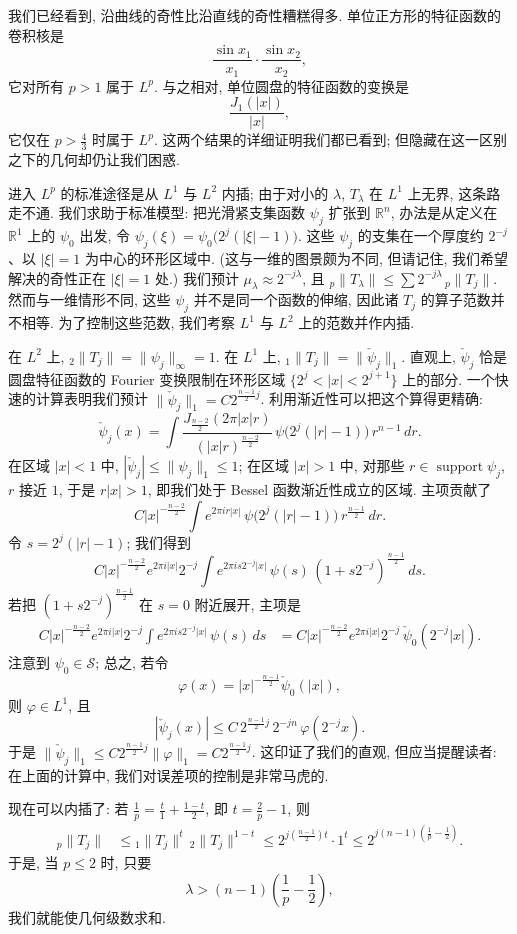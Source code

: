 \begin{remark}\label{rem:5.5}
我们已经看到, 沿曲线的奇性比沿直线的奇性糟糕得多. 单位正方形的特征函数的卷积核是
\[
\frac{\sin x_{1}}{x_{1}}\cdot\frac{\sin x_{2}}{x_{2}},
\]
它对所有 $p>1$ 属于 $L^{p}$. 与之相对, 单位圆盘的特征函数的变换是
\[
\frac{J_{1}(|x|)}{|x|},
\]
它仅在 $p>\frac{4}{3}$ 时属于 $L^p$. 这两个结果的详细证明我们都已看到; 但隐藏在这一区别之下的几何却仍让我们困惑.

进入 $L^p$ 的标准途径是从 $L^1$ 与 $L^2$ 内插; 由于对小的 $\lambda$, $T_\lambda$ 在 $L^1$ 上无界, 这条路走不通. 我们求助于标准模型: 把光滑紧支集函数 $\psi_j$ 扩张到 $\mathbb{R}^n$, 办法是从定义在 $\mathbb{R}^1$ 上的 $\psi_0$ 出发, 令 $\psi_j(\xi)=\psi_0\bigl(2^j(|\xi|-1)\bigr)$. 这些 $\psi_j$ 的支集在一个厚度约 $2^{-j}$、以 $|\xi|=1$ 为中心的环形区域中. (这与一维的图景颇为不同, 但请记住, 我们希望解决的奇性正在 $|\xi|=1$ 处.) 我们预计 $\mu_\lambda\approx 2^{-j\lambda}$, 且 ${}_p\|T_\lambda\|\leq\sum 2^{-j\lambda}\,{}_p\|T_j\|$. 然而与一维情形不同, 这些 $\psi_j$ 并不是同一个函数的伸缩, 因此诸 $T_j$ 的算子范数并不相等. 为了控制这些范数, 我们考察 $L^1$ 与 $L^2$ 上的范数并作内插.

在 $L^2$ 上, ${}_2\|T_j\|=\|\psi_j\|_\infty=1$. 在 $L^1$ 上, ${}_1\|T_j\|=\|\check{\psi}_j\|_1$. 直观上, $\check{\psi}_j$ 恰是圆盘特征函数的 Fourier 变换限制在环形区域 $\{2^j<|x|<2^{j+1}\}$ 上的部分. 一个快速的计算表明我们预计 $\|\check{\psi}_j\|_1=C2^{\frac{n-1}{2}j}$. 利用渐近性可以把这个算得更精确:
\[
\check{\psi}_{j}(x)=\int\frac{J_{\frac{n-2}{2}}(2\pi|x|r)}{(|x|r)^{\frac{n-2}{2}}}\,\psi\bigl(2^{j}(|r|-1)\bigr)\,r^{n-1}\,dr.
\]
在区域 $|x|<1$ 中, $|\check{\psi}_j|\leq\|\psi_j\|_1\leq 1$; 在区域 $|x|>1$ 中, 对那些 $r\in\operatorname{support}\psi_j$, $r$ 接近 $1$, 于是 $r|x|>1$, 即我们处于 Bessel 函数渐近性成立的区域. 主项贡献了
\[
C|x|^{-\frac{n-2}{2}}\int e^{2\pi ir|x|}\,\psi\bigl(2^{j}(|r|-1)\bigr)\,r^{\frac{n-1}{2}}\,dr.
\]
令 $s=2^{j}(|r|-1)$; 我们得到
\[
C|x|^{-\frac{n-2}{2}}e^{2\pi i|x|}2^{-j}\int e^{2\pi is2^{-j}|x|}\,\psi(s)\,(1+s2^{-j})^{\frac{n-1}{2}}\,ds.
\]
若把 $(1+s2^{-j})^{\frac{n-1}{2}}$ 在 $s=0$ 附近展开, 主项是
\begin{align*}
C|x|^{-\frac{n-2}{2}}e^{2\pi i|x|}2^{-j}\int e^{2\pi is2^{-j}|x|}\,\psi(s)\,ds
&=C|x|^{-\frac{n-2}{2}}e^{2\pi i|x|}2^{-j}\,\check{\psi}_{0}(2^{-j}|x|).
\end{align*}
注意到 $\psi_0\in\mathcal{S}$; 总之, 若令
\[
\varphi(x)=|x|^{-\frac{n-1}{2}}\check{\psi}_{0}(|x|),
\]
则 $\varphi\in L^1$, 且
\[
|\check{\psi}_{j}(x)|\leq C\,2^{\frac{n-1}{2}j}\,2^{-jn}\,\varphi(2^{-j}x).
\]
于是 $\|\check{\psi}_j\|_1\leq C2^{\frac{n-1}{2}j}\|\varphi\|_1=C2^{\frac{n-1}{2}j}$. 这印证了我们的直观, 但应当提醒读者: 在上面的计算中, 我们对误差项的控制是非常马虎的.

现在可以内插了: 若 $\frac{1}{p}=\frac{t}{1}+\frac{1-t}{2}$, 即 $t=\frac{2}{p}-1$, 则
\begin{align*}
{}_p\|T_{j}\|&\leq{}_{1}\|T_{j}\|^{t}\,{}_{2}\|T_{j}\|^{1-t}
\leq 2^{j\left(\frac{n-1}{2}\right)t}\cdot 1^{t}\leq 2^{j(n-1)\left(\frac{1}{p}-\frac{1}{2}\right)}.
\end{align*}
于是, 当 $p\leq 2$ 时, 只要
\[
\lambda>(n-1)\left(\frac{1}{p}-\frac{1}{2}\right),
\]
我们就能使几何级数求和.
\end{remark}

